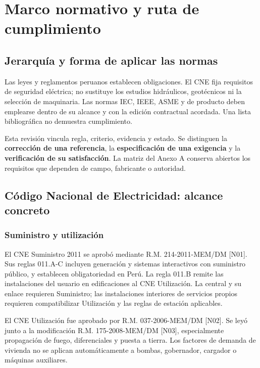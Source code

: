 \chapter{Marco normativo y ruta de cumplimiento}
\section{Jerarquía y forma de aplicar las normas}
Las leyes y reglamentos peruanos establecen obligaciones. El CNE fija requisitos de seguridad eléctrica; no sustituye los estudios hidráulicos, geotécnicos ni la selección de maquinaria. Las normas IEC, IEEE, ASME y de producto deben emplearse dentro de su alcance y con la edición contractual acordada. Una lista bibliográfica no demuestra cumplimiento.

Esta revisión vincula regla, criterio, evidencia y estado. Se distinguen la \textbf{corrección de una referencia}, la \textbf{especificación de una exigencia} y la \textbf{verificación de su satisfacción}. La matriz del Anexo A conserva abiertos los requisitos que dependen de campo, fabricante o autoridad.

\section{Código Nacional de Electricidad: alcance concreto}
\subsection{Suministro y utilización}
El CNE Suministro 2011 se aprobó mediante R.M. 214-2011-MEM/DM [N01]. Sus reglas 011.A-C incluyen generación y sistemas interactivos con suministro público, y establecen obligatoriedad en Perú. La regla 011.B remite las instalaciones del usuario en edificaciones al CNE Utilización. La central y su enlace requieren Suministro; las instalaciones interiores de servicios propios requieren compatibilizar Utilización y las reglas de estación aplicables.

El CNE Utilización fue aprobado por R.M. 037-2006-MEM/DM [N02]. Se leyó junto a la modificación R.M. 175-2008-MEM/DM [N03], especialmente propagación de fuego, diferenciales y puesta a tierra. Los factores de demanda de vivienda no se aplican automáticamente a bombas, gobernador, cargador o máquinas auxiliares.


